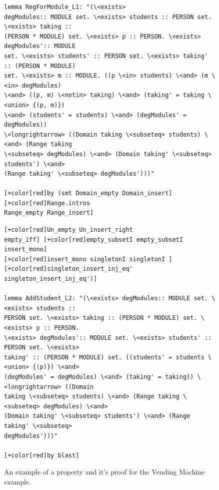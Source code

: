 \begin{figure}[H]
\centering
\begin{minipage}{0.45\textwidth}
\centering
\begin{scriptsize}
 

\begin{BVerbatim}[commandchars=+\[\]] 
lemma RegForModule_L1: "(\<exists>
degModules:: MODULE set. \<exists> students :: PERSON set. \<exists> taking ::
(PERSON * MODULE) set. \<exists> p :: PERSON. \<exists> degModules':: MODULE
set. \<exists> students' :: PERSON set. \<exists> taking' :: (PERSON * MODULE)
set. \<exists> m :: MODULE. ((p \<in> students) \<and> (m \<in> degModules)
\<and> ((p, m) \<notin> taking) \<and> (taking' = taking \<union> {(p, m)})
\<and> (students' = students) \<and> (degModules' = degModules))
\<longrightarrow> ((Domain taking \<subseteq> students) \<and> (Range taking
\<subseteq> degModules) \<and> (Domain taking' \<subseteq> students') \<and>
(Range taking' \<subseteq> degModules')))"

[+color[red]by (smt Domain_empty Domain_insert] [+color[red]Range.intros
Range_empty Range_insert]
\end{BVerbatim}
\end{scriptsize}
\end{minipage}\hfill
\begin{minipage}{0.45\textwidth}
\begin{scriptsize}
\begin{BVerbatim}[commandchars=+\[\]]
[+color[red]Un_empty Un_insert_right
empty_iff] [+color[red]empty_subsetI empty_subsetI insert_mono]
[+color[red]insert_mono singletonI singletonI ]
[+color[red]singleton_insert_inj_eq' singleton_insert_inj_eq')]

lemma AddStudent_L2: "(\<exists> degModules:: MODULE set. \<exists> students ::
PERSON set. \<exists> taking :: (PERSON * MODULE) set. \<exists> p :: PERSON.
\<exists> degModules':: MODULE set. \<exists> students' :: PERSON set. \<exists>
taking' :: (PERSON * MODULE) set. ((students' = students \<union> {(p)}) \<and>
(degModules' = degModules) \<and> (taking' = taking)) \<longrightarrow> ((Domain
taking \<subseteq> students) \<and> (Range taking \<subseteq> degModules) \<and>
(Domain taking' \<subseteq> students') \<and> (Range taking' \<subseteq>
degModules')))"

[+color[red]by blast]
\end{BVerbatim}
\end{scriptsize}
\end{minipage}
\caption{An example of a property and it's proof for the Vending Machine example. \label{fig:propertyproof}}
\end{figure}

